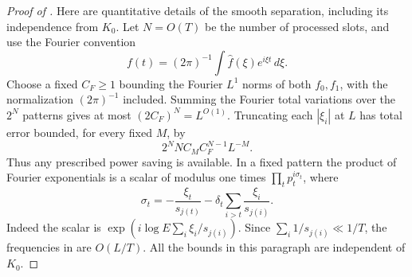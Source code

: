 \begin{proof}[Proof of ]
Here are quantitative details of the smooth separation, including its
independence from $K_0$. Let $N=O(T)$ be the number of processed slots,
and use the Fourier convention
\[
             f(t)=(2\pi)^{-1}\int\widehat f(\xi)e^{i\xi t}\,d\xi.
\]
Choose a fixed $C_F\geq1$ bounding the Fourier $L^1$ norms of both
$f_0,f_1$, with the normalization $(2\pi)^{-1}$ included.
Summing the Fourier total variations over the $2^N$ patterns gives
at most $(2C_F)^N=L^{O(1)}$. Truncating each $|\xi_i|$ at $L$ has
total error bounded, for every fixed $M$, by
\[
       2^NN C_M C_F^{N-1}L^{-M}.
\]
Thus any prescribed power saving is available. In a fixed pattern the
product of Fourier exponentials is a scalar of modulus one times
$\prod_t p_t^{i\sigma_t}$, where
\begin{equation}\label{eq:typeii-slot-frequencies}
 \sigma_t=-\frac{\xi_t}{s_{j(t)}}
                 -\delta_t\sum_{i>t}\frac{\xi_i}{s_{j(i)}}.
\end{equation}
Indeed the scalar is
$\exp(i\log E\sum_i\xi_i/s_{j(i)})$. Since
$\sum_i1/s_{j(i)}\ll1/T$, the frequencies in
 are $O(L/T)$.
All the bounds in this paragraph are independent of $K_0$.


\end{proof}
